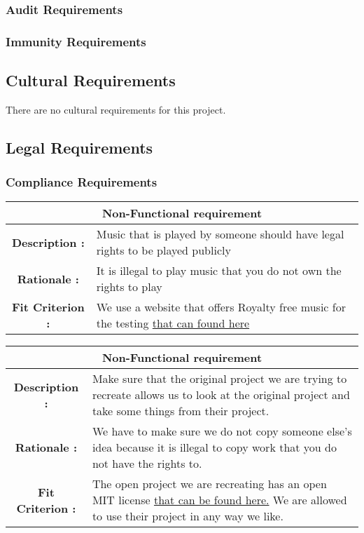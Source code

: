 \documentclass[12pt, titlepage]{article}
\begin{document}
\subsubsection{Audit Requirements}
\subsubsection{Immunity Requirements}

\subsection{Cultural Requirements}
There are no cultural requirements for this project.
\subsection{Legal Requirements}
\subsubsection{Compliance Requirements}

\begin{center}
\begin{table}[H]
\begin{tabularx}{\textwidth}{| c X |}
\hline
\multicolumn{2}{|c|}{\textbf{Non-Functional requirement}}\\
\hline
\textbf{Description : } &  Music that is played by someone should have legal rights to be played publicly \\
\hline
\textbf{Rationale : } & It is illegal to play music that you do not own the rights to play \\
\hline
\textbf{Fit Criterion : } & We use a website that offers Royalty free music for the testing \href{http://www.bensound.com/}{that can found here} \\
\hline
\end{tabularx}
\end{table}
\end{center}

\begin{center}
\begin{table} [H]
\begin{tabularx}{\textwidth}{| c X |}
\hline
\multicolumn{2}{|c|}{\textbf{Non-Functional requirement}}\\
\hline
\textbf{Description : } & Make sure that the original project we are trying to recreate allows us to look at the original project and take some things from their project. \\
\hline
\textbf{Rationale : } & We have to make sure we do not copy someone else's idea because it is illegal to copy work that you do not have the rights to. \\
\hline
\textbf{Fit Criterion : } & The open project we are recreating has an open MIT license \href{LICENSE.txt} {that can be found here.} We are allowed to use their project in any way we like.\\
\hline
\end{tabularx}
\end{table}
\end{center}
\end{document}
